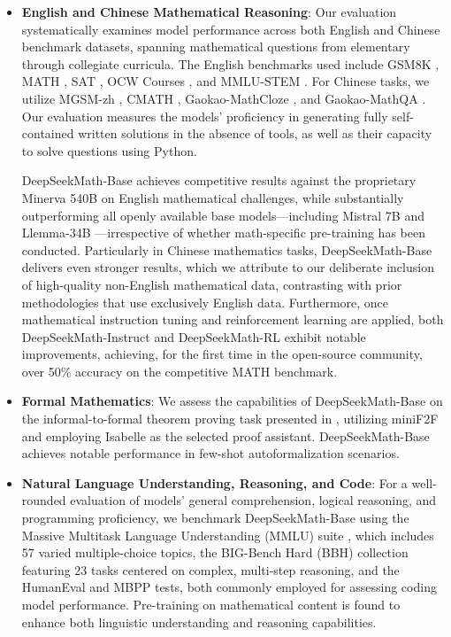 \begin{itemize}[topsep=0pt]
    \item \textbf{English and Chinese Mathematical Reasoning}: Our evaluation systematically examines model performance across both English and Chinese benchmark datasets, spanning mathematical questions from elementary through collegiate curricula. The English benchmarks used include GSM8K \citep{gsm8k}, MATH \citep{MATH}, SAT \citep{llemma}, OCW Courses \citep{minerva}, and MMLU-STEM \citep{mmlu}. For Chinese tasks, we utilize MGSM-zh \citep{mgsm}, CMATH \citep{wei2023cmath}, Gaokao-MathCloze \citep{agieval}, and Gaokao-MathQA \citep{agieval}. Our evaluation measures the models’ proficiency in generating fully self-contained written solutions in the absence of tools, as well as their capacity to solve questions using Python.

    DeepSeekMath-Base achieves competitive results against the proprietary Minerva 540B \citep{minerva} on English mathematical challenges, while substantially outperforming all openly available base models—including Mistral 7B \citep{mistral} and Llemma-34B \citep{llemma}—irrespective of whether math-specific pre-training has been conducted. Particularly in Chinese mathematics tasks, DeepSeekMath-Base delivers even stronger results, which we attribute to our deliberate inclusion of high-quality non-English mathematical data, contrasting with prior methodologies \citep{minerva,llemma} that use exclusively English data. Furthermore, once mathematical instruction tuning and reinforcement learning are applied, both DeepSeekMath-Instruct and DeepSeekMath-RL exhibit notable improvements, achieving, for the first time in the open-source community, over 50\% accuracy on the competitive MATH benchmark.

\item \textbf{Formal Mathematics}: We assess the capabilities of DeepSeekMath-Base on the informal-to-formal theorem proving task presented in \citep{dsp_proof}, utilizing miniF2F \citep{minif2f} and employing Isabelle \citep{isabelle} as the selected proof assistant. DeepSeekMath-Base achieves notable performance in few-shot autoformalization scenarios.

\item \textbf{Natural Language Understanding, Reasoning, and Code}: For a well-rounded evaluation of models' general comprehension, logical reasoning, and programming proficiency, we benchmark DeepSeekMath-Base using the Massive Multitask Language Understanding (MMLU) suite \citep{mmlu}, which includes 57 varied multiple-choice topics, the BIG-Bench Hard (BBH) collection \citep{bbh} featuring 23 tasks centered on complex, multi-step reasoning, and the HumanEval \citep{codex} and MBPP \citep{mbpp} tests, both commonly employed for assessing coding model performance. Pre-training on mathematical content is found to enhance both linguistic understanding and reasoning capabilities.


\end{itemize}
